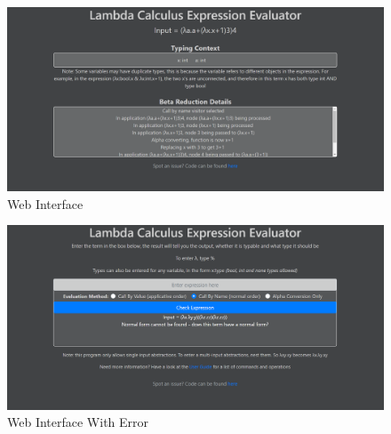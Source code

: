 \documentclass[a4paper,11pt]{article}
\begin{document}
\begin{figure}[p]
	\includegraphics[scale=0.4]{images/web_interface_more_information}
	\centering
	\caption{Web Interface}
	\label{web_interface_more_information}
\end{figure}

\begin{figure}[p]
	\centering
	\includegraphics[scale=0.4]{images/web_interface_error}
	\caption{Web Interface With Error}
	\label{web_interface_error}
\end{figure}
\end{document}
